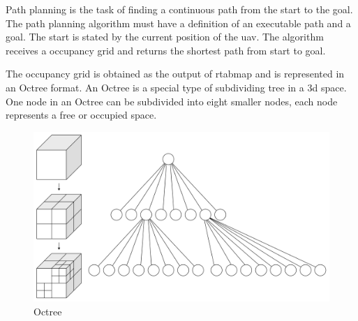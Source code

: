 Path planning is the task of finding a continuous path from the start to the goal. The path planning algorithm must have a definition of an executable path and a goal. The start is stated by the current position of the \acs{uav}. The algorithm receives a occupancy grid and returns the shortest path from start to goal. \cite{KLANCAR2017161}

The occupancy grid is obtained as the output of \acs{rtabmap} and is represented in an Octree format. An Octree is a special type of subdividing tree in a \acs{3d} space. One node in an Octree can be subdivided into eight smaller nodes, each node represents a free or occupied space. \cite{octrees_gamedev}

\begin{figure}[!h]
  \centering
  \includegraphics[width=0.6\linewidth]{images/octree.png}
  \caption{Octree \cite{octrees_gamedev}}
\end{figure}